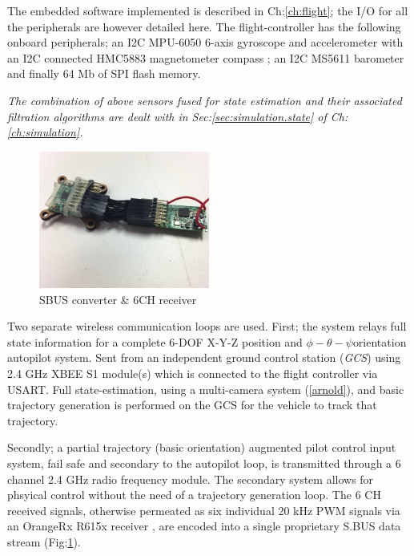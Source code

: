 \par
The embedded software implemented is described in Ch:\ref{ch:flight}; the I/O for all the peripherals are however detailed here. The flight-controller has the following onboard peripherals; an I2C MPU-6050 6-axis gyroscope and accelerometer \cite{mpu6050} with an I2C connected HMC5883 magnetometer compass \cite{hmc5883}; an I2C MS5611 barometer \cite{ms5611} and finally 64 Mb of SPI flash memory.
\par
\emph{\color{Gray}The combination of above sensors fused for state estimation and their associated filtration algorithms are dealt with in Sec:\ref{sec:simulation.state} of Ch:\ref{ch:simulation}.\\}
\begin{figure}[hbtp]
\centering
\includegraphics[width=0.5\textwidth]{figs/ppm-sbus}
\caption{SBUS converter \& 6CH receiver}
\label{fig:ppm-sbus}
\vspace{-20pt}
\end{figure}
\par
Two separate wireless communication loops are used. First; the system relays full state information for a complete 6-DOF X-Y-Z position and $\phi-\theta-\psi$orientation autopilot system. Sent from an independent ground control station (\emph{GCS}) using 2.4 GHz XBEE S1 module(s)\cite{xbees1} which is connected to the flight controller via USART. Full state-estimation, using a multi-camera system (\ref{arnold}), and basic trajectory generation is performed on the GCS for the vehicle to track that trajectory. 
\par
Secondly; a partial trajectory (basic orientation) augmented pilot control input system, fail safe and secondary to the autopilot loop, is transmitted through a 6 channel 2.4 GHz radio frequency module. The secondary system allows for phsyical control without the need of a trajectory generation loop. The 6 CH received signals, otherwise permeated as six individual 20 kHz PWM signals via an OrangeRx R615x receiver \cite{r615x}, are encoded into a single proprietary S.BUS data stream (Fig:\ref{fig:ppm-sbus}). 
